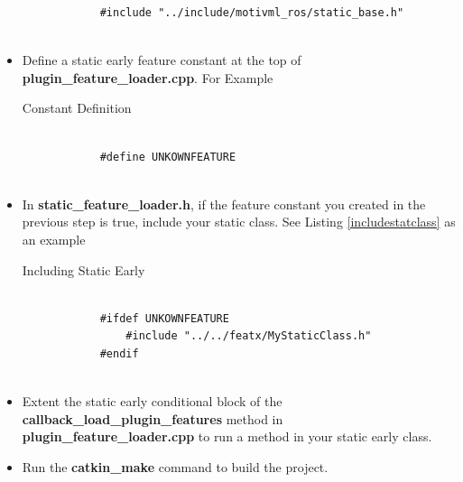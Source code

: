 \documentclass{article}
\newenvironment{longlisting}{\captionsetup{type=listing}}{}
\begin{document}
\begin{itemize}
\begin{longlisting}
\begin{verbatim}
			#include "../include/motivml_ros/static_base.h"
			
		\end{verbatim}
		\label{classinclude}
	\end{longlisting}
	\item Define a static early feature constant at the top of \textbf{plugin\_feature\_loader.cpp}. For Example
	
	\begin{longlisting}
		\caption{Constant Definition}
		\begin{verbatim}
			
			#define UNKOWNFEATURE
			
		\end{verbatim}
		\label{definepreproccomm}
	\end{longlisting}
	
	\item In \textbf{static\_feature\_loader.h}, if the feature constant you created in the previous step is true, include your static class. See Listing \ref{includestatclass} as an example
	\begin{longlisting}
		\caption{Including Static Early}
		\begin{verbatim}
			
			#ifdef UNKOWNFEATURE
				#include "../../featx/MyStaticClass.h"
			#endif
			
		\end{verbatim}
		\label{includestatclass}
	\end{longlisting}

	\item Extent the static early conditional block of the \textbf{callback\_load\_plugin\_features} method in \textbf{plugin\_feature\_loader.cpp} to run a method in your static early class.
	
	\item Run the \textbf{catkin\_make} command to build the project.
\end{itemize}
\end{document}
